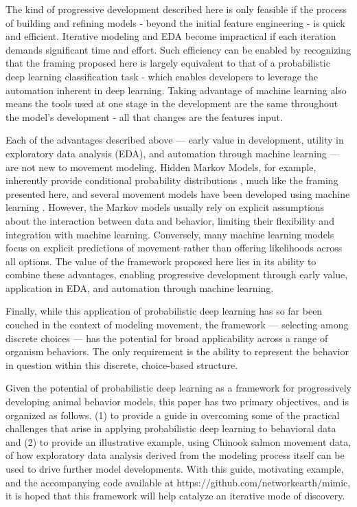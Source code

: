 \documentclass[11pt]{article}
\begin{document}
The kind of progressive development described here is only feasible if the process of building and refining models - beyond the initial feature engineering - is quick and efficient. Iterative modeling and EDA become impractical if each iteration demands significant time and effort. Such efficiency can be enabled by recognizing that the framing proposed here is largely equivalent to that of a probabilistic deep learning classification task \citep{durr} - which enables developers to leverage the automation inherent in deep learning. Taking advantage of machine learning also means the tools used at one stage in the development are the same throughout the model's development - all that changes are the features input. 

Each of the advantages described above — early value in development, utility in exploratory data analysis (EDA), and automation through machine learning — are not new to movement modeling. Hidden Markov Models, for example, inherently provide conditional probability distributions \citep{mlmovement1}, much like the framing presented here, and several movement models have been developed using machine learning \citep{mlmovement1}\citep{mlmovement2}\citep{mlmovement3}. However, the Markov models usually rely on explicit assumptions about the interaction between data and behavior, limiting their flexibility and integration with machine learning. Conversely, many machine learning models focus on explicit predictions of movement rather than offering likelihoods across all options. The value of the framework proposed here lies in its ability to combine these advantages, enabling progressive development through early value, application in EDA, and automation through machine learning. 

Finally, while this application of probabilistic deep learning has so far been couched in the context of modeling movement, the framework — selecting among discrete choices — has the potential for broad applicability across a range of organism behaviors. The only requirement is the ability to represent the behavior in question within this discrete, choice-based structure.

Given the potential of probabilistic deep learning as a framework for progressively developing animal behavior models, this paper has two primary objectives, and is organized as follows. (1) to provide a guide in overcoming some of the practical challenges that arise in applying probabilistic deep learning to behavioral data and (2) to provide an illustrative example, using Chinook salmon movement data, of how exploratory data analysis derived from the modeling process itself can be used to drive further model developments. With this guide, motivating example, and the accompanying code available at https://github.com/networkearth/mimic, it is hoped that this framework will help catalyze an iterative mode of discovery.
\end{document}
